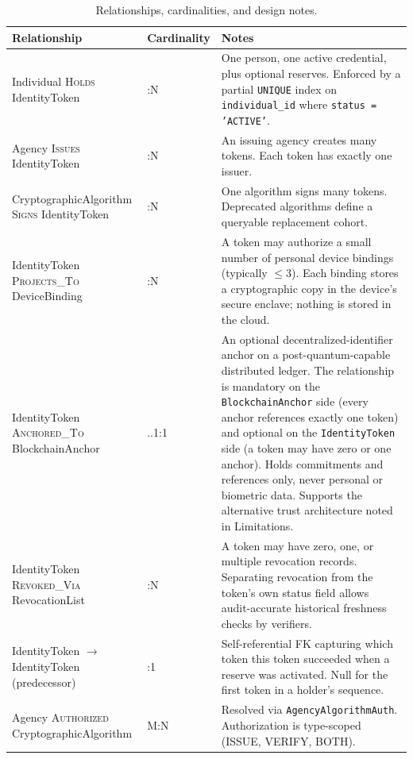 \documentclass[11pt,letterpaper]{article}
\newcommand{\entity}[1]{\texttt{\color{navydark}#1}}
\newcommand{\thead}[1]{\textbf{\color{white}\small #1}}
\begin{document}
\begin{table}[H]
\centering
\footnotesize
\caption{Relationships, cardinalities, and design notes.}
\label{tab:relationships}
\setlength{\tabcolsep}{4pt}
\renewcommand{\arraystretch}{1.1}
\begin{tabularx}{\textwidth}{>{\RaggedRight\arraybackslash}p{1.95in} >{\centering\arraybackslash}p{0.85in} >{\RaggedRight\arraybackslash}X}
\toprule
\rowcolor{tabheader}
\thead{Relationship} & \thead{Cardinality} & \thead{Notes} \\
\midrule
Individual \textsc{Holds} IdentityToken & 1:N & One person, one active credential, plus optional reserves. Enforced by a partial \texttt{UNIQUE} index on \texttt{individual\_id} where \texttt{status = 'ACTIVE'}. \\
Agency \textsc{Issues} IdentityToken & 1:N & An issuing agency creates many tokens. Each token has exactly one issuer. \\
CryptographicAlgorithm \textsc{Signs} IdentityToken & 1:N & One algorithm signs many tokens. Deprecated algorithms define a queryable replacement cohort. \\
IdentityToken \textsc{Projects\_To} DeviceBinding & 1:N & A token may authorize a small number of personal device bindings (typically $\leq 3$). Each binding stores a cryptographic copy in the device's secure enclave; nothing is stored in the cloud. \\
IdentityToken \textsc{Anchored\_To} BlockchainAnchor & 0..1:1 & An optional decentralized-identifier anchor on a post-quantum-capable distributed ledger. The relationship is mandatory on the \entity{BlockchainAnchor} side (every anchor references exactly one token) and optional on the \entity{IdentityToken} side (a token may have zero or one anchor). Holds commitments and references only, never personal or biometric data. Supports the alternative trust architecture noted in Limitations. \\
IdentityToken \textsc{Revoked\_Via} RevocationList & 1:N & A token may have zero, one, or multiple revocation records. Separating revocation from the token's own status field allows audit-accurate historical freshness checks by verifiers. \\
IdentityToken $\rightarrow$ IdentityToken (predecessor) & 0:1 & Self-referential FK capturing which token this token succeeded when a reserve was activated. Null for the first token in a holder's sequence. \\
Agency \textsc{Authorized} CryptographicAlgorithm & M:N & Resolved via \entity{AgencyAlgorithmAuth}. Authorization is type-scoped (ISSUE, VERIFY, BOTH). \\

\end{tabularx}
\end{table}
\end{document}
